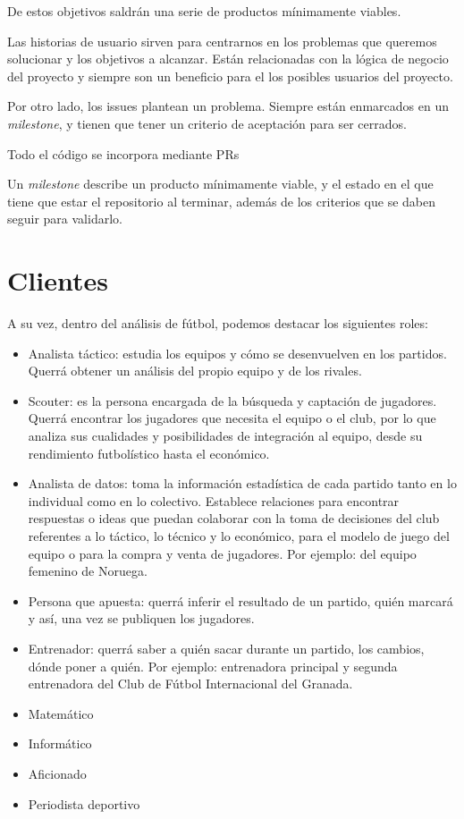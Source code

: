 De estos objetivos saldrán una serie de productos mínimamente viables. 

Las historias de usuario sirven para centrarnos en los problemas que queremos solucionar 
y los objetivos a alcanzar. Están relacionadas con la lógica de 
negocio del proyecto y siempre son un beneficio para el los posibles usuarios del proyecto.

Por otro lado, los issues  plantean un problema. Siempre están enmarcados en un \textit{milestone}, 
y tienen que tener un criterio de aceptación para ser cerrados. 

Todo el código se incorpora mediante PRs

Un \textit{milestone} describe un producto mínimamente viable, y el estado en el que tiene 
que estar el repositorio al terminar, además de los criterios que se daben seguir 
para validarlo.


\section{Clientes}
A su vez, dentro del análisis de fútbol, podemos destacar los siguientes roles:

\begin{itemize}
    \item Analista táctico: estudia los equipos y cómo se desenvuelven en los partidos. 
    Querrá obtener un análisis del propio equipo y de los rivales.
    \item Scouter: es la persona encargada de la búsqueda y captación 
    de jugadores. Querrá encontrar los jugadores que necesita el equipo 
    o el club, por lo que analiza sus cualidades y posibilidades de 
    integración al equipo, desde su rendimiento futbolístico hasta el 
    económico.
    \item Analista de datos: toma la información estadística de 
    cada partido tanto en lo individual como en lo colectivo. 
    Establece relaciones para encontrar respuestas o ideas que 
    puedan colaborar con la toma de decisiones del club referentes 
    a lo táctico, lo técnico y lo económico, para el modelo de 
    juego del equipo o para la compra y venta de jugadores. Por ejemplo: del 
    equipo femenino de Noruega. 
    \item Persona que apuesta: querrá inferir el resultado de un partido, 
    quién marcará y así, una vez se publiquen los jugadores. 
    \item Entrenador: querrá saber a quién sacar durante un partido, los 
    cambios, dónde poner a quién. Por ejemplo: entrenadora principal y 
    segunda entrenadora del Club de Fútbol Internacional del Granada.
    \item Matemático 
    \item Informático 
    \item Aficionado  
    \item Periodista deportivo 
\end{itemize}


